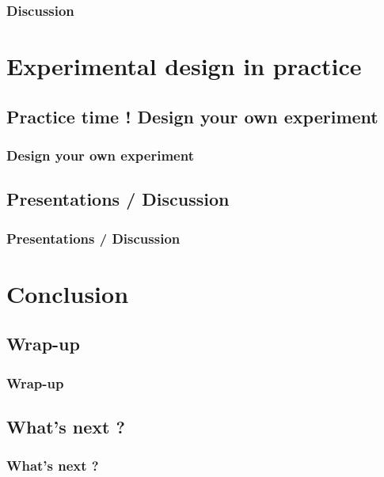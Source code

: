 \documentclass[xcolor=dvipsnames,english]{beamer}
\begin{document}
\begin{frame}
  \frametitle{Discussion}
\end{frame}


\section{Experimental design in practice}
\subsection{Practice time ! Design your own experiment}

\begin{frame}
  \frametitle{Design your own experiment}
\end{frame}

\subsection{Presentations / Discussion}

\begin{frame}
  \frametitle{Presentations / Discussion}
\end{frame}


\section{Conclusion}
\subsection{Wrap-up}

\begin{frame}
  \frametitle{Wrap-up}
\end{frame}

\subsection{What's next ?}


\begin{frame}
  \frametitle{What's next ?}
\end{frame}
\end{document}
